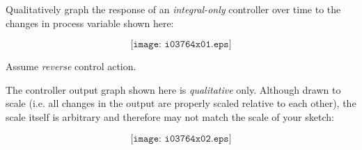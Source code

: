 

Qualitatively graph the response of an {\it integral-only} controller over time to the changes in process variable shown here:

$$\texttt{[image: i03764x01.eps]}$$

Assume {\it reverse} control action.







The controller output graph shown here is {\it qualitative} only.  Although drawn to scale (i.e. all changes in the output are properly scaled relative to each other), the scale itself is arbitrary and therefore may not match the scale of your sketch:

$$\texttt{[image: i03764x02.eps]}$$










